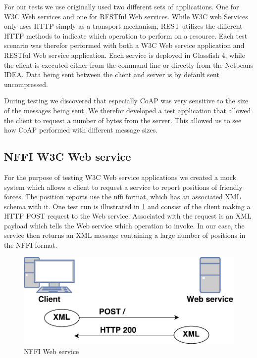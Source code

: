 For our tests we use originally used two different sets of applications. One for
W3C Web services and one for RESTful  Web services. While W3C web Services only
uses HTTP simply as a transport mechanism, REST utilizes the different HTTP
methods to indicate which operation to perform on a resource. Each test scenario
was therefor performed with both a W3C Web service application and RESTful Web
service application. Each service is deployed in Glassfish 4, while the client
is executed either from the command line or directly from the Netbeans IDEA.
Data being sent between the client and server is by default sent uncompressed.

During testing we discovered that especially CoAP was very sensitive to the
size of the messages being sent. We therefor developed a test application that
allowed the client to request a number of bytes from the server. This allowed us
to see how CoAP performed with different message sizes.

\subsection{NFFI W3C Web service}

For the purpose of testing W3C Web service applications we created a mock system
which allows a client to request a service to report positions of friendly
forces. The position reports use the \gls{nffi} format, which has an associated
XML schema with it. One test run is illustrated in \cref{figure-nffi-flow} and
consist of the client making a HTTP POST request to the Web service. Associated
with the request is an XML payload which tells the Web service which operation
to invoke. In our case, the service then returns an XML message containing a
large number of positions in the NFFI format.

\begin{figure}[h]
\centering
\includegraphics[scale=0.6]{images/nffi_flow.pdf}
\caption{NFFI Web service}
\label{figure-nffi-flow}
\end{figure}


